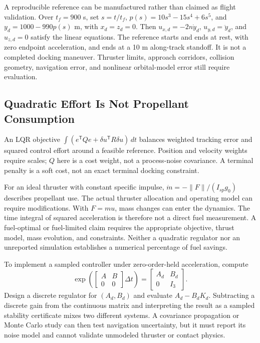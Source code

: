 A reproducible reference can be manufactured rather than claimed as flight validation. Over $t_f=900$ s, set $s=t/t_f$, $p(s)=10s^3-15s^4+6s^5$, and $y_d=1000-990p(s)$ m, with $x_d=z_d=0$. Then $u_{x,d}=-2n\dot y_d$, $u_{y,d}=\ddot y_d$, and $u_{z,d}=0$ satisfy the linear equations. The reference starts and ends at rest, with zero endpoint acceleration, and ends at a 10 m along-track standoff. It is not a completed docking maneuver. Thruster limits, approach corridors, collision geometry, navigation error, and nonlinear orbital-model error still require evaluation.

\subsection{Quadratic Effort Is Not Propellant Consumption}

An LQR objective $\int(e^{\mathsf T}Qe+\delta u^{\mathsf T}R\delta u)\,dt$ balances weighted tracking error and squared control effort around a feasible reference. Position and velocity weights require scales; $Q$ here is a cost weight, not a process-noise covariance. A terminal penalty is a soft cost, not an exact terminal docking constraint.

For an ideal thruster with constant specific impulse, $\dot m=-\|F\|/(I_{sp}g_0)$ describes propellant use. The actual thruster allocation and operating model can require modifications. With $F=mu$, mass changes can enter the dynamics. The time integral of squared acceleration is therefore not a direct fuel measurement. A fuel-optimal or fuel-limited claim requires the appropriate objective, thrust model, mass evolution, and constraints. Neither a quadratic regulator nor an unreported simulation establishes a numerical percentage of fuel savings.

To implement a sampled controller under zero-order-held acceleration, compute
\begin{equation}
 \exp\left(\begin{bmatrix}A&B\\0&0\end{bmatrix}\Delta t\right)
 =\begin{bmatrix}A_d&B_d\\0&I_3\end{bmatrix}.
\end{equation}
Design a discrete regulator for $(A_d,B_d)$ and evaluate $A_d-B_dK_d$. Subtracting a discrete gain from the continuous matrix and interpreting the result as a sampled stability certificate mixes two different systems. A covariance propagation or Monte Carlo study can then test navigation uncertainty, but it must report its noise model and cannot validate unmodeled thruster or contact physics.

